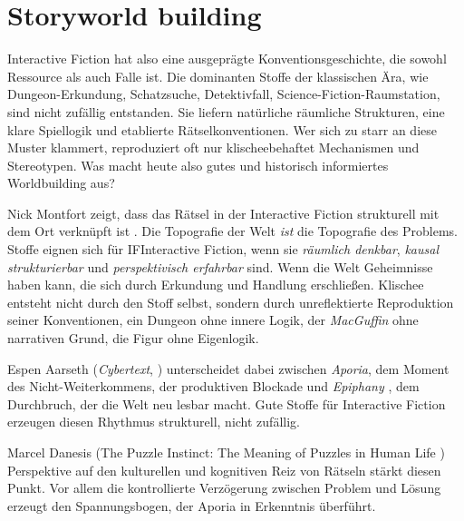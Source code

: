 \documentclass[parskip=half,a4paper,11pt]{scrreprt}
\begin{document}
\section{Storyworld building}

Interactive Fiction hat also eine ausgeprägte Konventionsgeschichte, die sowohl Ressource als auch Falle ist. Die dominanten Stoffe der klassischen Ära, wie Dungeon-Erkundung, Schatzsuche, Detektivfall, Science-Fiction-Raumstation, sind nicht zufällig entstanden. Sie liefern natürliche räumliche Strukturen, eine klare Spiellogik und etablierte Rätselkonventionen. Wer sich zu starr an diese Muster klammert, reproduziert oft nur klischeebehaftet Mechanismen und Stereotypen. Was macht heute also gutes und historisch informiertes Worldbuilding aus?

Nick Montfort zeigt, dass das Rätsel in der Interactive Fiction strukturell mit dem Ort verknüpft ist \citep{Montfort2003}. Die Topografie der Welt \textit{ist} die Topografie des Problems. Stoffe eignen sich für IFInteractive Fiction, wenn sie \textit{räumlich denkbar}, \textit{kausal strukturierbar} und \textit{perspektivisch erfahrbar} sind. Wenn die Welt Geheimnisse haben kann, die sich durch Erkundung und Handlung erschließen. Klischee entsteht nicht durch den Stoff selbst, sondern durch unreflektierte Reproduktion seiner Konventionen, ein Dungeon ohne innere Logik, der \textit{MacGuffin} ohne narrativen Grund, die Figur ohne Eigenlogik. 

Espen Aarseth (\textit{Cybertext}, \citep{Aarseth1997}) unterscheidet dabei zwischen \textit{Aporia}, dem Moment des Nicht-Weiterkommens, der produktiven Blockade und \textit{Epiphany} , dem Durchbruch, der die Welt neu lesbar macht. Gute Stoffe für Interactive Fiction erzeugen diesen Rhythmus strukturell, nicht zufällig.

Marcel Danesis (The Puzzle Instinct: The Meaning of Puzzles in Human Life \citep{Danesi2002}) Perspektive auf den kulturellen und kognitiven Reiz von Rätseln stärkt diesen Punkt. Vor allem die kontrollierte Verzögerung zwischen Problem und Lösung erzeugt den Spannungsbogen, der Aporia in  Erkenntnis überführt.
\end{document}
